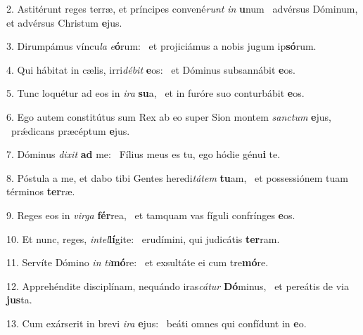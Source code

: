 2. Astitérunt reges terræ, et príncipes convené\textit{runt} \textit{in} \textbf{u}num \ast\  advérsus Dóminum, et advérsus Christum \textbf{e}jus.\

3. Dirumpámus víncu\textit{la} \textit{e}\textbf{ó}rum: \ast\  et projiciámus a nobis jugum ip\textbf{só}rum.\

4. Qui hábitat in cælis, irri\textit{dé}\textit{bit} \textbf{e}os: \ast\  et Dóminus subsannábit \textbf{e}os.\

5. Tunc loquétur ad eos in \textit{i}\textit{ra} \textbf{su}a, \ast\  et in furóre suo conturbábit \textbf{e}os.\

6. Ego autem constitútus sum Rex ab eo super Sion montem \textit{sanc}\textit{tum} \textbf{e}jus, \ast\  prǽdicans præcéptum \textbf{e}jus.\

7. Dóminus \textit{di}\textit{xit} \textbf{ad} me: \ast\  Fílius meus es tu, ego hódie génu\textbf{i} te.\

8. Póstula a me, et dabo tibi Gentes heredi\textit{tá}\textit{tem} \textbf{tu}am, \ast\  et possessiónem tuam términos \textbf{ter}ræ.\

9. Reges eos in \textit{vir}\textit{ga} \textbf{fér}rea, \ast\  et tamquam vas fíguli confrínges \textbf{e}os.\

10. Et nunc, reges, \textit{in}\textit{tel}\textbf{lí}gite: \ast\  erudímini, qui judicátis \textbf{ter}ram.\

11. Servíte Dómino \textit{in} \textit{ti}\textbf{mó}re: \ast\  et exsultáte ei cum tre\textbf{mó}re.\

12. Apprehéndite disciplínam, nequándo iras\textit{cá}\textit{tur} \textbf{Dó}minus, \ast\  et pereátis de via \textbf{jus}ta.\

13. Cum exárserit in brevi \textit{i}\textit{ra} \textbf{e}jus: \ast\  beáti omnes qui confídunt in \textbf{e}o.\

